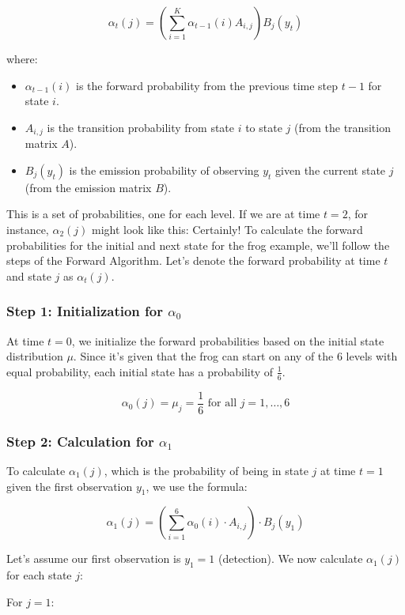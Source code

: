 \documentclass[10pt]{article}
\begin{document}
\[ \alpha_t(j) = \left( \sum_{i=1}^{K} \alpha_{t-1}(i) A_{i,j} \right) B_j(y_t) \]

where:

\begin{itemize}
  \item \( \alpha_{t-1}(i) \) is the forward probability from the previous time step \( t-1 \) for state \( i \).
  \item \( A_{i,j} \) is the transition probability from state \( i \) to state \( j \) (from the transition matrix \( A \)).
  \item \( B_j(y_t) \) is the emission probability of observing \( y_t \) given the current state \( j \) (from the emission matrix \( B \)).
\end{itemize}

This is a set of probabilities, one for each level. If we are at time \( t = 2 \), for instance, \( \alpha_2(j) \) might look like this:
Certainly! To calculate the forward probabilities for the initial and next state for the frog example, we'll follow the steps of the Forward Algorithm. Let's denote the forward probability at time \( t \) and state \( j \) as \( \alpha_t(j) \).

\subsubsection*{Step 1: Initialization for \( \alpha_0 \)}
At time \( t = 0 \), we initialize the forward probabilities based on the initial state distribution \( \mu \). Since it's given that the frog can start on any of the 6 levels with equal probability, each initial state has a probability of \( \frac{1}{6} \).

\[ \alpha_0(j) = \mu_j = \frac{1}{6} \text{ for all } j = 1, \ldots, 6 \]

\subsubsection*{Step 2: Calculation for \( \alpha_1 \)}
To calculate \( \alpha_1(j) \), which is the probability of being in state \( j \) at time \( t = 1 \) given the first observation \( y_1 \), we use the formula:

\[ \alpha_1(j) = \left( \sum_{i=1}^{6} \alpha_0(i) \cdot A_{i,j} \right) \cdot B_j(y_1) \]

Let's assume our first observation is \( y_1 = 1 \) (detection). We now calculate \( \alpha_1(j) \) for each state \( j \):

For \( j = 1 \):
\end{document}
